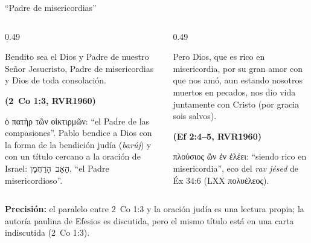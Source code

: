 \documentclass[hyperref={bookmarks=false},aspectratio=169]{beamer}
\newcommand{\heb}[1]{\mbox{\foreignlanguage{hebrew}{#1}}}
\newcommand{\grc}[1]{\foreignlanguage{ancientgreek}{#1}}
\newcommand{\fuente}[1]{\par\hfill{\upshape\bfseries\footnotesize\textcolor{azul}{#1}}}
\newcommand{\precision}[1]{{\footnotesize\color{gris}\textbf{Precisión:} #1}}
\begin{document}
\begin{frame}{``Padre de misericordias''}
\begin{columns}[t,onlytextwidth]
\begin{column}{0.49\textwidth}
\begin{cita}Bendito sea el Dios y Padre de nuestro Señor Jesucristo, Padre de misericordias y Dios de toda consolación.\fuente{(2~Co 1:3, RVR1960)}\end{cita}
\scriptsize\grc{ὁ πατὴρ τῶν οἰκτιρμῶν}: ``el Padre de las compasiones''. Pablo bendice a Dios con la forma de la bendición judía (\emph{barúj}) y con un título cercano a la oración de Israel: \heb{הָאָב הָרַחֲמָן}, ``el Padre misericordioso''.
\end{column}
\begin{column}{0.49\textwidth}
\begin{cita}Pero Dios, que es rico en misericordia, por su gran amor con que nos amó, aun estando nosotros muertos en pecados, nos dio vida juntamente con Cristo (por gracia sois salvos).\fuente{(Ef 2:4--5, RVR1960)}\end{cita}
\scriptsize\grc{πλούσιος ὢν ἐν ἐλέει}: ``siendo rico en misericordia'', eco del \emph{rav jésed} de Éx 34:6 (LXX \grc{πολυέλεος}).
\end{column}
\end{columns}\par\smallskip
\precision{el paralelo entre 2~Co 1:3 y la oración judía es una lectura propia; la autoría paulina de Efesios es discutida, pero el mismo título está en una carta indiscutida (2~Co 1:3).}
\end{frame}
\end{document}
